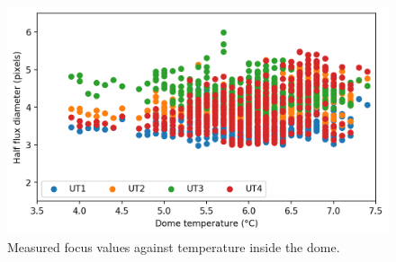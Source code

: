 \begin{colsection}
\begin{figure}[p]
    \begin{center}
    \includegraphics[width=0.95\linewidth]{images/focus_temp.png}
    \end{center}
    \caption[Measured focus values against temperature]{
        Measured focus values against temperature inside the dome.
    }\label{fig:focus_temp}
\end{figure}

\clearpage

\end{colsection}


